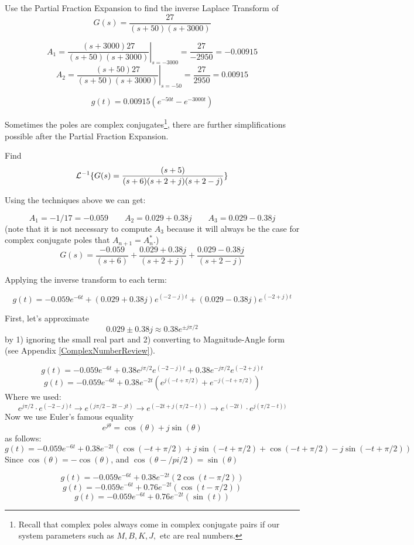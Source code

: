 \begin{ExampleSmall}
Use the Partial Fraction Expansion to find the inverse Laplace Transform of
\[
G(s) =  \frac          {27}             {(s+50)(s+3000)}
\]


\[
A_1 = \left . \frac {(s+3000)27}{(s+50)(s+3000)} \right |_{s=-3000} = \frac {27}{-2950} = -0.00915
\]
\[
A_2 = \left . \frac {(s+50)27}{(s+50)(s+3000)} \right |_{s=-50} = \frac {27}{2950} = 0.00915
\]

\[
g(t) = 0.00915(e^{-50t}-e^{-3000t})
\]

\end{ExampleSmall}



Sometimes the poles are complex conjugates\footnote{Recall that complex poles always come in complex conjugate pairs if our
system parameters such as $M,B,K,J,$ etc are real numbers.}, there are further simplifications possible after the Partial Fraction Expansion.




\begin{Example}

Find
\[
\mathcal{L}^{-1}\{G(s) = \frac{(s+5)}{(s+6)(s+2+j)(s+2-j)}\}
\]

\vspace{0.25in}

Using the techniques above we can get:

\[
A_1 = -1/17 = -0.059 \qquad A_2 = 0.029+0.38j \qquad A_3 = 0.029-0.38j
\]
(note that it is not necessary to compute $A_3$ because it will always be the case for complex conjugate poles that $A_{n+1} = A_n^*$.)
\[
G(s)  = \frac {-0.059} {(s+6)}  + \frac {0.029+0.38j} {(s+2+j)}  + \frac {0.029-0.38j} {(s+2-j)}
\]

Applying the inverse transform to each term:

\[
g(t) = -0.059e^{-6t} + (0.029+0.38j)e^{(-2-j)t}+ (0.029-0.38j)e^{(-2+j)t}
\]

First, let's approximate
\[
0.029\pm 0.38j \approx 0.38e^{\pm j \pi/2}
\]
by 1) ignoring the small real part and
2) converting to Magnitude-Angle form (see Appendix \ref{ComplexNumberReview}).

\[
g(t) = -0.059e^{-6t} + 0.38e^{j\pi/2}e^{(-2-j)t} + 0.38e^{-j\pi/2}e^{(-2+j)t}
\]
\[
g(t) = -0.059e^{-6t} + 0.38e^{-2t} \left ( e^{j(-t+\pi/2)}+e^{-j(-t+\pi/2)} \right )
\]
Where we used:
\[
e^{j\pi/2}\cdot e^{(-2-j)t} \to e^{(j\pi/2-2t-jt)} \to e^{(-2t+j(\pi/2-t))} \to  e^{(-2t)}\cdot e^{j(\pi/2-t))}
\]
Now we use Euler's famous equality
\[
e^{j\theta} = \cos(\theta) + j \sin(\theta)
\]
as follows:
\[
g(t) = -0.059e^{-6t} + 0.38e^{-2t} \left (
    \cos(-t+\pi/2) + j\sin(-t+\pi/2)+
    \cos(-t+\pi/2) - j\sin(-t+\pi/2)
    \right )
\]
Since $\cos(\theta) = -\cos(\theta)$, and $\cos(\theta-/pi/2) = \sin(\theta)$

\[
g(t) = -0.059e^{-6t} + 0.38e^{-2t} \left (
    2\cos(t-\pi/2)
    \right )
\]
\[
g(t) = -0.059e^{-6t} + 0.76e^{-2t} \left (
    \cos(t-\pi/2)
    \right )
\]
\[
g(t) = -0.059e^{-6t} + 0.76e^{-2t} \left (  \sin(t)  \right )
\]

\end{Example}



